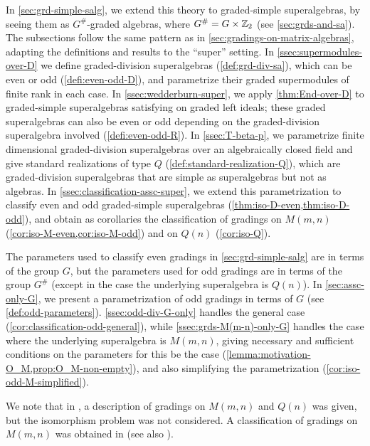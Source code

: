In \cref{sec:grd-simple-salg}, we extend this theory to graded-simple superalgebras, by seeing them as $G^\#$-graded algebras, where $G^\# = G \times \mathbb{Z}_2$ (see \cref{sec:grds-and-sa}). 
The subsections follow the same pattern as in \cref{sec:gradings-on-matrix-algebras}, adapting the definitions and results to the ``super'' setting. 
In \cref{ssec:supermodules-over-D} we define graded-division superalgebras (\cref{def:grd-div-sa}), which can be even or odd (\cref{defi:even-odd-D}), and parametrize their graded supermodules of finite rank in each case. 
In \cref{ssec:wedderburn-super}, we apply \cref{thm:End-over-D} to graded-simple superalgebras satisfying \dcc on graded left ideals; these graded superalgebras can also be even or odd depending on the graded-division superalgebra involved (\cref{defi:even-odd-R}). 
In \cref{ssec:T-beta-p}, we parametrize finite dimensional graded-division superalgebras over an algebraically closed field and give standard realizations of type $Q$ (\cref{def:standard-realization-Q}), which are graded-division superalgebras that are simple as superalgebras but not as algebras. 
In \cref{ssec:classification-assc-super}, we extend this parametrization to classify even and odd graded-simple superalgebras (\cref{thm:iso-D-even,thm:iso-D-odd}), and obtain as corollaries the classification of gradings on $M(m,n)$ (\cref{cor:iso-M-even,cor:iso-M-odd}) and on $Q(n)$ (\cref{cor:iso-Q}).

The parameters used to classify even gradings in \cref{sec:grd-simple-salg} are in terms of the group $G$, but the parameters used for odd gradings are in terms of the group $G^\#$ (except in the case the underlying superalgebra is $Q(n)$). 
In \cref{sec:assc-only-G}, we present a parametrization of odd gradings in terms of $G$ (see \cref{def:odd-parameters}). 
\cref{ssec:odd-div-G-only} handles the general case (\cref{cor:classification-odd-general}), while \cref{ssec:grds-M(m-n)-only-G} handles the case where the underlying superalgebra is $M(m,n)$, giving necessary and sufficient conditions on the parameters for this be the case (\cref{lemma:motivation-O_M,prop:O_M-non-empty}), and also simplifying the parametrization (\cref{cor:iso-odd-M-simplified}). 

We note that in \cite{BS}, a description of gradings on $M(m,n)$ and $Q(n)$ was given, but the isomorphism problem was not considered. 
A classification of gradings on $M(m,n)$ was obtained in \cite{paper-MAP} (see also \cite{Helens_thesis}). 


